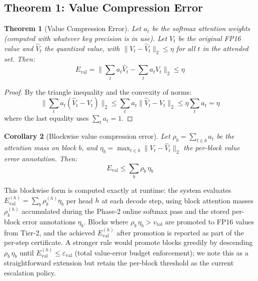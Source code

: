 \documentclass[10pt,twocolumn,a4paper]{article}
\newtheorem{theorem}{Theorem}[section]
\newtheorem{corollary}[theorem]{Corollary}
\theoremstyle{definition}
\theoremstyle{remark}
\newcommand{\norm}[1]{\lVert #1 \rVert}
\begin{document}
\subsection{Theorem 1: Value Compression Error}
\label{sec:val_error}

\begin{theorem}[Value Compression Error]
\label{thm:val}
Let $a_t$ be the softmax attention weights (computed with whatever key precision is in use).  Let $V_t$ be the original FP16 value and $\hat{V}_t$ the quantized value, with $\norm{V_t - \hat{V}_t}_2 \leq \eta$ for all $t$ in the attended set.  Then:
\begin{equation}
  E_{\mathrm{val}} = \norm{\sum_t a_t \hat{V}_t - \sum_t a_t V_t}_2 \leq \eta
\end{equation}
\end{theorem}

\begin{proof}
By the triangle inequality and the convexity of norms:
\[
  \norm{\sum_t a_t (\hat{V}_t - V_t)}_2 \leq \sum_t a_t \norm{\hat{V}_t - V_t}_2 \leq \eta \sum_t a_t = \eta
\]
where the last equality uses $\sum_t a_t = 1$.
\end{proof}

\begin{corollary}[Blockwise value compression error]
\label{cor:val_block}
Let $\rho_b = \sum_{t \in b} a_t$ be the attention mass on block $b$, and $\eta_b = \max_{t \in b} \norm{V_t - \hat{V}_t}_2$ the per-block value error annotation.  Then:
\begin{equation}
  E_{\mathrm{val}} \leq \sum_b \rho_b \,\eta_b
  \label{eq:val_block}
\end{equation}
\end{corollary}

This blockwise form is computed exactly at runtime: the system evaluates
$E_{\mathrm{val}}^{(h)} = \sum_b \rho_b^{(h)} \eta_b$ per head $h$ at each decode step, using block attention masses $\rho_b^{(h)}$ accumulated during the Phase-2 online softmax pass and the stored per-block error annotations $\eta_b$.  Blocks where $\rho_b \,\eta_b > v_{\mathrm{tol}}$ are promoted to FP16 values from Tier-2, and the achieved $E_{\mathrm{val}}^{(h)}$ after promotion is reported as part of the per-step certificate.  A stronger rule would promote blocks greedily by descending $\rho_b \,\eta_b$ until $E_{\mathrm{val}}^{(h)} \leq \varepsilon_{\mathrm{val}}$ (total value-error budget enforcement); we note this as a straightforward extension but retain the per-block threshold as the current escalation policy.
\end{document}
